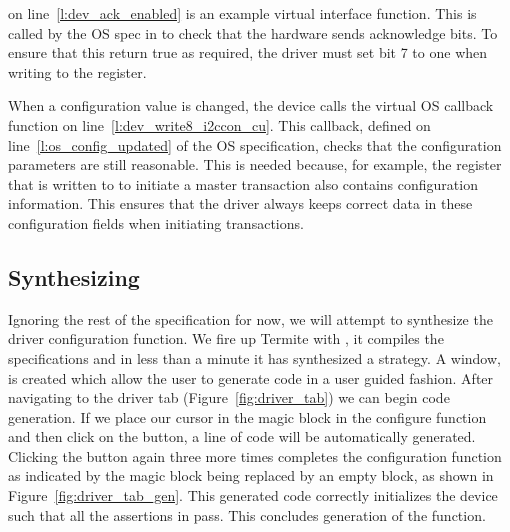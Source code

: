  on line~\ref{l:dev_ack_enabled} is an example virtual interface function. This is called by the OS spec in  to check that the hardware sends acknowledge bits. To ensure that this return true as required, the driver must set bit 7 to one when writing to the  register.

When a configuration value is changed, the device calls the virtual OS callback function  on line~\ref{l:dev_write8_i2ccon_cu}. This callback, defined on line~\ref{l:os_config_updated} of the OS specification, checks that the configuration parameters are still reasonable. This is needed because, for example, the register that is written to to initiate a master transaction also contains configuration information. This ensures that the driver always keeps correct data in these configuration fields when initiating transactions.

\subsection{Synthesizing}
Ignoring the rest of the specification for now, we will attempt to synthesize the driver configuration function. We fire up Termite with , it compiles the specifications and in less than a minute it has synthesized a strategy. A window, is created which allow the user to generate code in a user guided fashion. After navigating to the driver tab (Figure~\ref{fig:driver_tab}) we can begin code generation. If we place our cursor in the magic block in the configure function and then click on the  button, a line of code will be automatically generated. Clicking the  button again three more times completes the configuration function as indicated by the magic block being replaced by an empty block, as shown in Figure~\ref{fig:driver_tab_gen}. This generated code correctly initializes the device such that all the assertions in  pass. This concludes generation of the  function.

